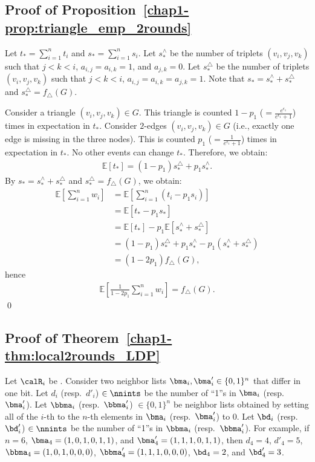 \subsection{Proof of Proposition~\ref{chap1-prop:triangle_emp_2rounds}}
Let $t_* = \sum_{i=1}^n t_i$ and $s_* = \sum_{i=1}^n s_i$. 
Let $s_*^{\wedge}$ be the number of triplets $(v_i,v_j,v_k)$ such that $j<k<i$, $a_{i,j} = a_{i,k} = 1$, and $a_{j,k} = 0$. 
Let $s_*^{\triangle}$ be the number of triplets $(v_i,v_j,v_k)$ such that $j<k<i$, $a_{i,j} = a_{i,k} = a_{j,k} =1$. 
Note that 
$s_* = s_*^{\wedge} + s_*^{\triangle}$ and 
$s_*^{\triangle} = f_\triangle(G)$. 

Consider a triangle $(v_i,v_j,v_k) \in G$. 
This triangle is counted $1-p_1$ ($= \frac{e^{\epsilon_1}}{e^{\epsilon_1}+1}$) times in expectation in $t_*$. 
Consider $2$-edges $(v_i,v_j,v_k) \in G$ (i.e., exactly one edge is missing in the three nodes). 
This is counted $p_1$ ($= \frac{1}{e^{\epsilon_1}+1}$) times in expectation in $t_*$.  
No other events can change $t_*$. 
Therefore, we obtain:
\begin{align*}
\mathbb{E}[t_*] = (1-p_1) s_*^{\triangle} + p_1 s_*^{\wedge}. 
\end{align*}
By $s_* = s_*^{\wedge} + s_*^{\triangle}$ and 
$s_*^{\triangle} = f_\triangle(G)$, we obtain:
\begin{align*}
\mathbb{E}\left[\sum_{i=1}^n w_i \right] 
&= \mathbb{E}\left[\sum_{i=1}^n (t_i - p_1 s_i) \right] \\
&= \mathbb{E}[t_* - p_1 s_*] \\
&= \mathbb{E}[t_*] - p_1 \mathbb{E}[s_*^{\wedge} + s_*^{\triangle}] \\
&= (1-p_1) s_*^{\triangle} + p_1 s_*^{\wedge} - p_1 (s_*^{\wedge} + s_*^{\triangle}) \\
&= (1 - 2 p_1) f_\triangle(G),
\end{align*}
hence 
\begin{align*}
\textstyle{\mathbb{E}\left[ \frac{1}{1-2p_1} \sum_{i=1}^n w_i \right] = f_\triangle(G).}
\end{align*}
\qed

\subsection{Proof of Theorem~\ref{chap1-thm:local2rounds_LDP}}
Let $\calR_i$ be . 
Consider two neighbor lists $\bma_i,\bma'_i \in \{0,1\}^n$ that differ in one bit. 
Let $d_i$ (resp.~$d'_i$) $\in \nnints$ be the number of ``1''s in $\bma_i$ (resp.~$\bma'_i$). 
Let $\bbma_i$ (resp.~$\bbma'_i$) $\in \{0,1\}^n$ be neighbor lists obtained by setting all of the $i$-th to the $n$-th elements in $\bma_i$ (resp.~$\bma'_i$) to $0$. 
Let $\bd_i$ (resp.~$\bd'_i$) $\in \nnints$ be the number of ``1''s in $\bbma_i$ (resp.~$\bbma'_i$). 
For example, if $n=6$, $\bma_4=(1,0,1,0,1,1)$, and $\bma'_4=(1,1,1,0,1,1)$, then 
$d_4=4$, $d'_4=5$, $\bbma_4=(1,0,1,0,0,0)$, $\bbma'_4=(1,1,1,0,0,0)$, $\bd_4=2$, and $\bd'_4=3$. 

